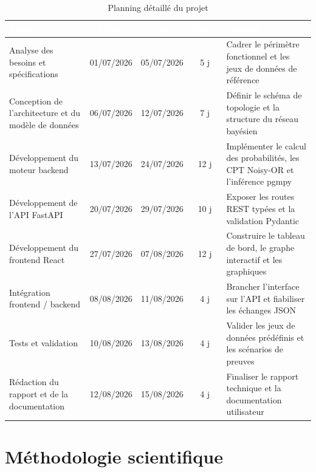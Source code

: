 \documentclass[12pt,a4paper]{article}
\renewcommand{\arraystretch}{1.4}
\newcommand{\forcereset}[1]{%
    \needspace{#1\baselineskip}%
}
\begin{document}
\begin{table}[H]
\centering
\caption{Planning détaillé du projet}
\label{tab:planning}
\footnotesize
\setlength{\tabcolsep}{4pt}
\renewcommand{\arraystretch}{1.2}
\begin{tabularx}{\textwidth}{X c c c X}
\toprule
\rowcolor{primary}
\textcolor{white}{\textbf{Phase}} & \textcolor{white}{\textbf{Début}} & \textcolor{white}{\textbf{Fin}} & \textcolor{white}{\textbf{Durée}} & \textcolor{white}{\textbf{Objectif}} \\
\midrule
Analyse des besoins et spécifications & 01/07/2026 & 05/07/2026 & 5 j & Cadrer le périmètre fonctionnel et les jeux de données de référence \\
Conception de l'architecture et du modèle de données & 06/07/2026 & 12/07/2026 & 7 j & Définir le schéma de topologie et la structure du réseau bayésien \\
Développement du moteur backend & 13/07/2026 & 24/07/2026 & 12 j & Implémenter le calcul des probabilités, les CPT Noisy-OR et l'inférence pgmpy \\
Développement de l'API FastAPI & 20/07/2026 & 29/07/2026 & 10 j & Exposer les routes REST typées et la validation Pydantic \\
Développement du frontend React & 27/07/2026 & 07/08/2026 & 12 j & Construire le tableau de bord, le graphe interactif et les graphiques \\
Intégration frontend / backend & 08/08/2026 & 11/08/2026 & 4 j & Brancher l'interface sur l'API et fiabiliser les échanges JSON \\
Tests et validation & 10/08/2026 & 13/08/2026 & 4 j & Valider les jeux de données prédéfinis et les scénarios de preuves \\
Rédaction du rapport et de la documentation & 12/08/2026 & 15/08/2026 & 4 j & Finaliser le rapport technique et la documentation utilisateur \\
\bottomrule
\end{tabularx}
\end{table}

\newpage

\section{Méthodologie scientifique}
\forcereset{6}
\end{document}
